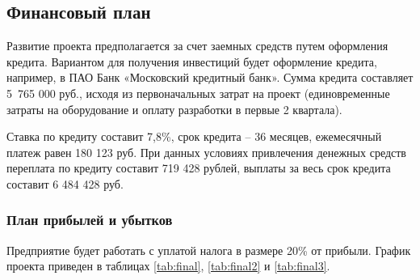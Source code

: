 \documentclass[../main]{subfiles}
\begin{document}
\subsection{Финансовый план}

Развитие проекта предполагается за счет заемных средств путем оформления кредита. Вариантом для получения инвестиций будет оформление кредита, например, в ПАО Банк «Московский кредитный банк». Сумма кредита составляет 5 765 000 руб., исходя из первоначальных затрат на проект (единовременные затраты на оборудование и оплату разработки в первые 2 квартала).

Ставка по кредиту составит 7,8\%, срок кредита -- 36 месяцев, ежемесячный платеж равен 180 123 руб. При данных условиях привлечения денежных средств переплата по кредиту составит 719 428 рублей, выплаты за весь срок кредита составит 6 484 428 руб. 

\subsubsection{План прибылей и убытков}
Предприятие будет работать с уплатой налога в размере 20\% от прибыли. График проекта приведен в таблицах \ref{tab:final}, \ref{tab:final2} и \ref{tab:final3}.
\end{document}

